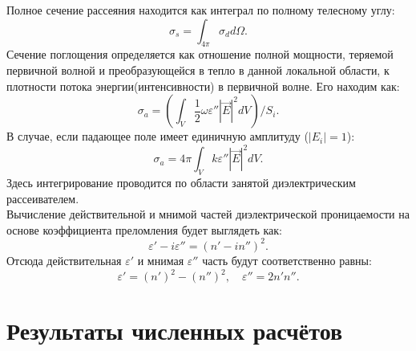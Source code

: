 Полное сечение рассеяния находится как интеграл по полному телесному углу:
\begin{equation}
\sigma_s = \int_{4\pi} \sigma_d d\Omega.
\end{equation}
Сечение поглощения определяется как отношение полной мощности, теряемой первичной волной и преобразующейся в тепло в данной локальной области, к плотности потока энергии(интенсивности) в первичной волне. Его находим как:
\begin{equation}
\sigma_a = \left(\int_V \dfrac{1}{2}\omega\varepsilon''|{\vec E}|^2 d V\right)/S_i.
\end{equation}
В случае, если падающее поле имеет единичную амплитуду ($|E_i|=1$):
\begin{equation}
\sigma_a = 4\pi \int_V k \varepsilon''|{\vec E}|^2 d V.
\end{equation}
Здесь интегрирование проводится по области занятой диэлектрическим рассеивателем.\\
Вычисление действительной и мнимой частей диэлектрической проницаемости на основе коэффициента преломления будет выглядеть как:
\begin{equation}
\varepsilon' - i \varepsilon'' = (n'-i n'')^2.
\end{equation}
Отсюда действительная $ \varepsilon' $ и мнимая $ \varepsilon'' $ часть будут соответственно равны:
\begin{equation}
\varepsilon' = (n')^2 - (n'')^2,\quad \varepsilon'' = 2 n'n''.
\end{equation}

\section{Результаты численных расчётов}


%

